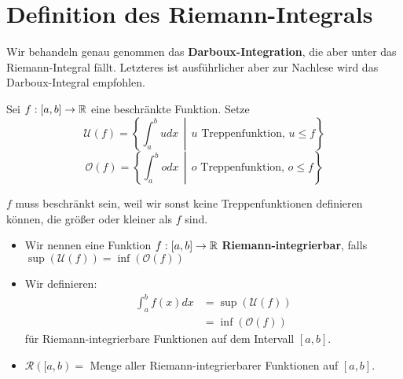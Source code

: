 \documentclass[main.tex]{subfiles}
\begin{document}
\section{Definition des Riemann-Integrals}

\begin{Bemerkung}
  Wir behandeln genau genommen das \textbf{Darboux-Integration}, die aber unter das Riemann-Integral fällt. Letzteres ist ausführlicher aber zur Nachlese wird das Darboux-Integral empfohlen.
\end{Bemerkung}

\begin{Definition}
  Sei $f:[a,b] \to \mathbb{R}$ eine beschränkte Funktion. Setze
  $$\mathcal{U}(f) = \left\{\int_a^b u dx \,\middle|\, u \text{ Treppenfunktion, } u \leq f \right\}$$
  $$\mathcal{O}(f) = \left\{\int_a^b o dx \,\middle|\,   o \text{ Treppenfunktion, } o \leq f \right\}$$
  \begin{Bemerkung}
    $f$ muss beschränkt sein, weil wir sonst keine Treppenfunktionen definieren können, die größer oder kleiner als $f$ sind.
  \end{Bemerkung}
  \begin{itemize}
    \item Wir nennen eine Funktion $f:[a,b] \to \mathbb{R}$ \textbf{Riemann-integrierbar}, falls $\sup(\mathcal{U}(f)) = \inf(\mathcal{O}(f))$
    \item Wir definieren:
      $$\begin{aligned}
        \int_a^b f(x) dx &= \sup(\mathcal{U}(f))\\
        &= \inf(\mathcal{O}(f))
      \end{aligned}$$
      für Riemann-integrierbare Funktionen auf dem Intervall $[a,b]$.
    \item $\mathcal{R}([a,b) = $ Menge aller Riemann-integrierbarer Funktionen auf $[a,b]$.
  \end{itemize}
\end{Definition}
\end{document}
